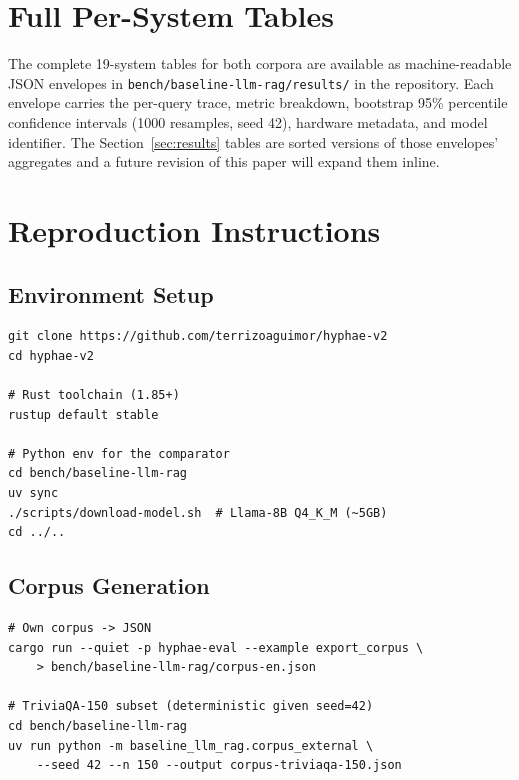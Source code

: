 \section{Full Per-System Tables}
\label{app:full-tables}

The complete 19-system tables for both corpora are available
as machine-readable JSON envelopes in
\texttt{bench/baseline-llm-rag/results/} in the repository.
Each envelope carries the per-query trace, metric breakdown,
bootstrap 95\% percentile confidence intervals (1000 resamples,
seed 42), hardware metadata, and model identifier. The
Section~\ref{sec:results} tables are sorted versions of those
envelopes' aggregates and a future revision of this paper will
expand them inline.

\section{Reproduction Instructions}
\label{app:reproduce}

\subsection{Environment Setup}

\begin{lstlisting}[caption={Setup commands.},
                    label={lst:setup}]
git clone https://github.com/terrizoaguimor/hyphae-v2
cd hyphae-v2

# Rust toolchain (1.85+)
rustup default stable

# Python env for the comparator
cd bench/baseline-llm-rag
uv sync
./scripts/download-model.sh  # Llama-8B Q4_K_M (~5GB)
cd ../..
\end{lstlisting}

\subsection{Corpus Generation}

\begin{lstlisting}[caption={Export the own corpus and build the
TriviaQA-150 column.},
                    label={lst:corpus-gen}]
# Own corpus -> JSON
cargo run --quiet -p hyphae-eval --example export_corpus \
    > bench/baseline-llm-rag/corpus-en.json

# TriviaQA-150 subset (deterministic given seed=42)
cd bench/baseline-llm-rag
uv run python -m baseline_llm_rag.corpus_external \
    --seed 42 --n 150 --output corpus-triviaqa-150.json
\end{lstlisting}

